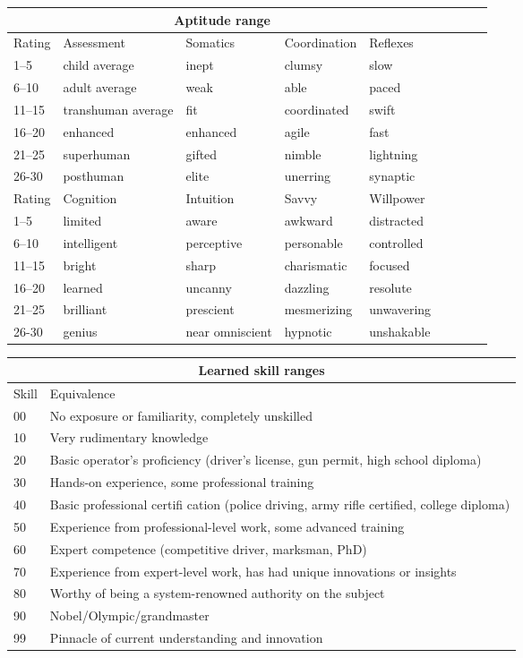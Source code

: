 \begin{tabular}{|l|l|l|l|l|l|l|l|l|}
\hline
\multicolumn{5}{|c|}{Aptitude range} \\
\hline
Rating & Assessment         & Somatics & Coordination & Reflexes  \\
\hline
1–5    & child average      & inept    & clumsy       & slow      \\
6–10   & adult average      & weak     & able         & paced     \\
11–15  & transhuman average & fit      & coordinated  & swift     \\
16–20  & enhanced           & enhanced & agile        & fast      \\
21–25  & superhuman         & gifted   & nimble       & lightning \\
26-30  & posthuman          & elite    & unerring     & synaptic  \\
\hline
Rating & Cognition   & Intuition       & Savvy       & Willpower \\
\hline
1–5    & limited     & aware           & awkward     & distracted \\
6–10   & intelligent & perceptive      & personable  & controlled \\
11–15  & bright      & sharp           & charismatic & focused    \\
16–20  & learned     & uncanny         & dazzling    & resolute   \\
21–25  & brilliant   & prescient       & mesmerizing & unwavering \\
26-30  & genius      & near omniscient & hypnotic    & unshakable \\
\hline
\end{tabular}

\begin{tabular}{|l|l|}
\hline
\multicolumn{2}{|c|}{Learned skill ranges} \\
\hline
Skill & Equivalence \\
\hline
00    & No exposure or familiarity, completely unskilled \\
10    & Very rudimentary knowledge \\
20    & Basic operator’s proficiency (driver’s license, gun permit, high school diploma) \\
30    & Hands-on experience, some professional training \\
40    & Basic professional certifi cation (police driving, army rifle certified, college diploma) \\
50    & Experience from professional-level work, some advanced training \\
60    & Expert competence (competitive driver, marksman, PhD) \\
70    & Experience from expert-level work, has had unique innovations or insights \\
80    & Worthy of being a system-renowned authority on the subject \\
90    & Nobel/Olympic/grandmaster \\
99    & Pinnacle of current understanding and innovation \\
\hline
\end{tabular}

